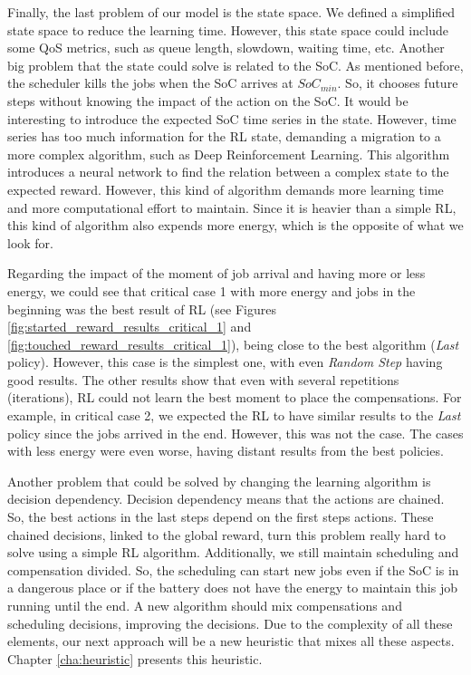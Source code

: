 Finally, the last problem of our model is the state space. We defined a simplified state space to reduce the learning time. However, this state space could include some QoS metrics, such as queue length, slowdown, waiting time, etc. Another big problem that the state could solve is related to the SoC. As mentioned before, the scheduler kills the jobs when the SoC arrives at $SoC_{min}$. So, it chooses future steps without knowing the impact of the action on the SoC. It would be interesting to introduce the expected SoC time series in the state. However, time series has too much information for the RL state, demanding a migration to a more complex algorithm, such as Deep Reinforcement Learning. This algorithm introduces a neural network to find the relation between a complex state to the expected reward. However, this kind of algorithm demands more learning time and more computational effort to maintain. Since it is heavier than a simple RL, this kind of algorithm also expends more energy, which is the opposite of what we look for. 

Regarding the impact of the moment of job arrival and having more or less energy, we could see that critical case 1 with more energy and jobs in the beginning was the best result of RL (see Figures \ref{fig:started_reward_results_critical_1} and \ref{fig:touched_reward_results_critical_1}), being close to the best algorithm (\emph{Last} policy). However, this case is the simplest one, with even \emph{Random Step} having good results. The other results show that even with several repetitions (iterations), RL could not learn the best moment to place the compensations. For example, in critical case 2, we expected the RL to have similar results to the \emph{Last} policy since the jobs arrived in the end. However, this was not the case. The cases with less energy were even worse, having distant results from the best policies.

Another problem that could be solved by changing the learning algorithm is decision dependency. Decision dependency means that the actions are chained. So, the best actions in the last steps depend on the first steps actions. These chained decisions, linked to the global reward, turn this problem really hard to solve using a simple RL algorithm. Additionally, we still maintain scheduling and compensation divided. So, the scheduling can start new jobs even if the SoC is in a dangerous place or if the battery does not have the energy to maintain this job running until the end. A new algorithm should mix compensations and scheduling decisions, improving the decisions. Due to the complexity of all these elements, our next approach will be a new heuristic that mixes all these aspects. Chapter \ref{cha:heuristic} presents this heuristic.

